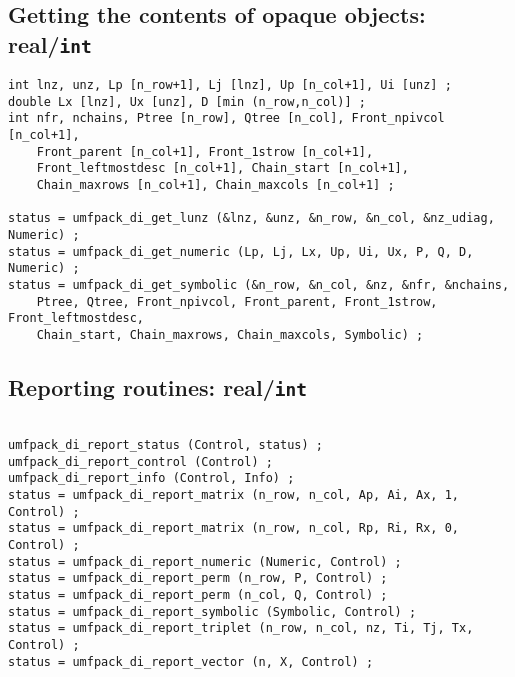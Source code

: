 \subsection{Getting the contents of opaque objects: real/{\tt int}}

{\footnotesize
\begin{verbatim}
int lnz, unz, Lp [n_row+1], Lj [lnz], Up [n_col+1], Ui [unz] ;
double Lx [lnz], Ux [unz], D [min (n_row,n_col)] ;
int nfr, nchains, Ptree [n_row], Qtree [n_col], Front_npivcol [n_col+1],
    Front_parent [n_col+1], Front_1strow [n_col+1],
    Front_leftmostdesc [n_col+1], Chain_start [n_col+1],
    Chain_maxrows [n_col+1], Chain_maxcols [n_col+1] ;

status = umfpack_di_get_lunz (&lnz, &unz, &n_row, &n_col, &nz_udiag, Numeric) ;
status = umfpack_di_get_numeric (Lp, Lj, Lx, Up, Ui, Ux, P, Q, D, Numeric) ;
status = umfpack_di_get_symbolic (&n_row, &n_col, &nz, &nfr, &nchains, 
    Ptree, Qtree, Front_npivcol, Front_parent, Front_1strow, Front_leftmostdesc,
    Chain_start, Chain_maxrows, Chain_maxcols, Symbolic) ;
\end{verbatim}
}

\subsection{Reporting routines: real/{\tt int}}

{\footnotesize
\begin{verbatim}

umfpack_di_report_status (Control, status) ;
umfpack_di_report_control (Control) ;
umfpack_di_report_info (Control, Info) ;
status = umfpack_di_report_matrix (n_row, n_col, Ap, Ai, Ax, 1, Control) ;
status = umfpack_di_report_matrix (n_row, n_col, Rp, Ri, Rx, 0, Control) ;
status = umfpack_di_report_numeric (Numeric, Control) ;
status = umfpack_di_report_perm (n_row, P, Control) ;
status = umfpack_di_report_perm (n_col, Q, Control) ;
status = umfpack_di_report_symbolic (Symbolic, Control) ;
status = umfpack_di_report_triplet (n_row, n_col, nz, Ti, Tj, Tx, Control) ;
status = umfpack_di_report_vector (n, X, Control) ;
\end{verbatim}
}






